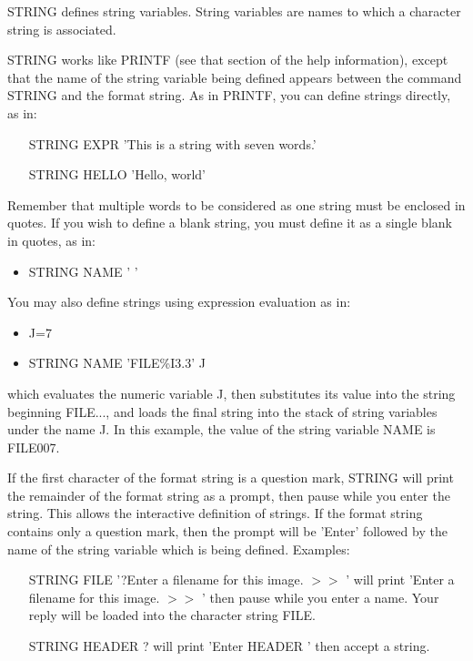 STRING defines string variables.  String variables are names to which a
character string is associated.

STRING works like PRINTF (see that section of the help information), except
that the name of the string variable being defined appears between the
command STRING and the format string.  As in PRINTF, you can define strings
directly, as in:
\begin{itemize}
  \item[STRING EXPR  'This is a string with seven words.'\hfill]{}
  \item[STRING HELLO 'Hello, world'\hfill]{}
\end{itemize}
Remember that multiple words to be considered as one string must be
enclosed in quotes.  If you wish to define a blank string, you must define
it as a single blank in quotes, as in:
\begin{itemize}
  \item{STRING NAME ' '}
\end{itemize}

You may also define strings using expression evaluation as in:
\begin{itemize}
  \item{J=7}
  \item{STRING NAME 'FILE\%I3.3' J}
\end{itemize}
which evaluates the numeric variable J, then substitutes its value into the
string beginning FILE..., and loads the final string into the stack of
string variables under the name J.  In this example, the value of the
string variable NAME is FILE007.

If the first character of the format string is a question mark, STRING will
print the remainder of the format string as a prompt, then pause while you
enter the string.  This allows the interactive definition of strings.  If
the format string contains only a question mark, then the prompt will be
'Enter' followed by the name of the string variable which is being defined.
Examples:
\begin{itemize}
  \item[STRING FILE '?Enter a filename for this image. $>>$ '\hfill]{ will
   print 'Enter a filename for this image. $>>$ ' then pause while you
   enter a name.  Your reply will be loaded into the character string
   FILE.}

   \item[STRING HEADER ?\hfill]{ will print 'Enter HEADER ' then accept a
        string.}
\end{itemize}

